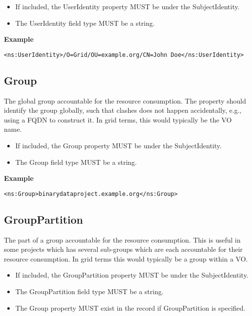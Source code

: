 \begin{itemize}
\item If included, the UserIdentity property MUST be under the
SubjectIdentity.
\item The UserIdentity field type MUST be a string.
\end{itemize}

{\bf Example}
\begin{verbatim}
<ns:UserIdentity>/O=Grid/OU=example.org/CN=John Doe</ns:UserIdentity>
\end{verbatim}


\subsection{Group}

The global group accountable for the resource consumption. The property should
identify the group globally, such that clashes does not happen accidentally,
e.g., using a FQDN to construct it. In grid terms, this would typically be the
VO name.

\begin{itemize}
\item If included, the Group property MUST be under the SubjectIdentity.
\item The Group field type MUST be a string.
\end{itemize}

{\bf Example}
\begin{verbatim}
<ns:Group>binarydataproject.example.org</ns:Group>
\end{verbatim}


\subsection{GroupPartition}

The part of a group accountable for the resource consumption. This is useful in
some projects which has several sub-groups which are each accountable for their
resource consumption. In grid terms this would typically be a group within a
VO.

\begin{itemize}
\item If included, the GroupPartition property MUST be under the
SubjectIdentity.
\item The GroupPartition field type MUST be a string.
\item The Group property MUST exist in the record if GroupPartition is
    specified.
\end{itemize}

